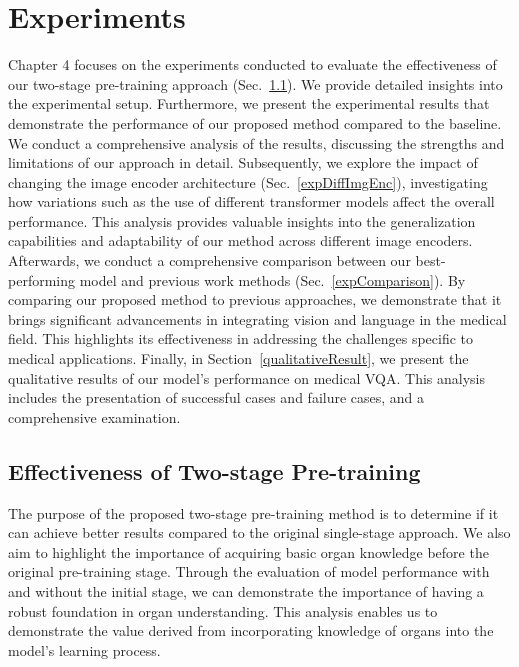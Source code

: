 \chapter{Experiments}
\label{chapter:ch4}

Chapter 4 focuses on the experiments conducted to evaluate the effectiveness of our two-stage pre-training approach (Sec.~\ref{expTwoStage}). We provide detailed insights into the experimental setup. Furthermore, we present the experimental results that demonstrate the performance of our proposed method compared to the baseline. We conduct a comprehensive analysis of the results, discussing the strengths and limitations of our approach in detail. Subsequently, we explore the impact of changing the image encoder architecture (Sec.~\ref{expDiffImgEnc}), investigating how variations such as the use of different transformer models affect the overall performance. This analysis provides valuable insights into the generalization capabilities and adaptability of our method across different image encoders. Afterwards, we conduct a comprehensive comparison between our best-performing model and previous work methods (Sec.~\ref{expComparison}). By comparing our proposed method to previous approaches, we demonstrate that it brings significant advancements in integrating vision and language in the medical field. This highlights its effectiveness in addressing the challenges specific to medical applications. Finally, in Section~\ref{qualitativeResult}, we present the qualitative results of our model's performance on medical VQA. This analysis includes the presentation of successful cases and failure cases, and a comprehensive examination.

\section{Effectiveness of Two-stage Pre-training}\label{expTwoStage}
The purpose of the proposed two-stage pre-training method is to determine if it can achieve better results compared to the original single-stage approach. We also aim to highlight the importance of acquiring basic organ knowledge before the original pre-training stage. Through the evaluation of model performance with and without the initial stage, we can demonstrate the importance of having a robust foundation in organ understanding. This analysis enables us to demonstrate the value derived from incorporating knowledge of organs into the model's learning process.


